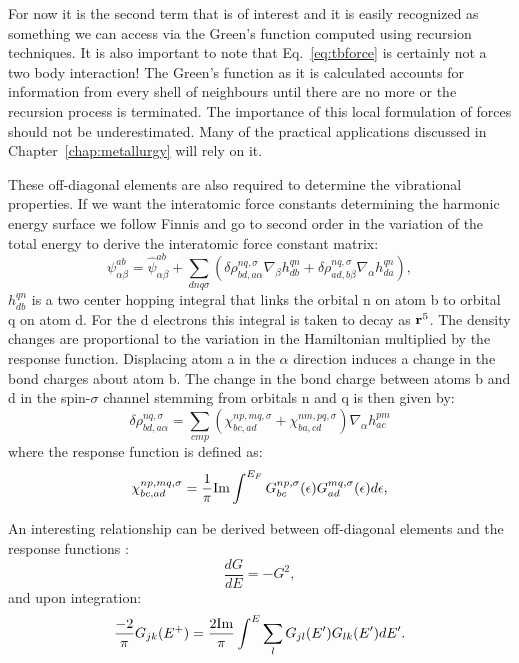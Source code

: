 For now it is the second term that is of interest and
it is easily recognized as something we can access via the Green's function 
computed using recursion techniques. It is also important to note that 
Eq.~\ref{eq:tbforce} is certainly not a two body interaction! The Green's function 
as it is calculated accounts for information from every shell of neighbours 
until there are no more or the recursion process is terminated. 
The importance of this local formulation of forces should not be underestimated.
Many of the practical applications discussed in Chapter~\ref{chap:metallurgy} 
will rely on it.

%
These off-diagonal elements are also required to determine the vibrational properties. 
If we want the interatomic force constants determining the harmonic energy surface 
we follow Finnis\cite{finnis84} and go to second order in the variation of the 
total energy to derive the interatomic force constant matrix:
%
\begin{equation}
\label{eq:tbdynmat}
\psi_{\alpha\beta}^{ab} = \hat{\psi}_{\alpha\beta}^{ab} +  \sum_{dnq\sigma}(\delta 
\rho_{bd,a\alpha}^{nq,\sigma}\nabla_{\beta}h_{db}^{qn} + \delta\rho_{ad,b\beta}^{nq,\sigma}\nabla_{\alpha}h_{da}^{qn}),
\end{equation}
%
$h^{qn}_{db}$ is a two center hopping integral that links the orbital n on atom b to orbital 
q on atom d. For the d electrons this integral is taken to decay as
${\bf r}^{5}$. The density changes are proportional to the variation in the Hamiltonian 
multiplied by the response function. Displacing atom a in the $\alpha$ direction induces a change in the
bond charges about atom b. The change in the bond charge between atoms b and d 
in the spin-$\sigma$ channel stemming from orbitals n and q is then given by:
%
\begin{equation}
\label{eq:tbdeltarho}
\delta \rho_{bd,a\alpha}^{nq,\sigma} = \sum_{cmp}(\chi_{bc,ad}^{np,mq,\sigma}+\chi_{ba,cd}^{nm,pq,\sigma})\nabla_{\alpha}h_{ac}^{pm}
\end{equation}
%
where the response function is defined as:
%
\begin{equation}
\label{eq:tbresponse}
\chi_{bc,ad}^{np,mq,\sigma} = \frac{1}{\pi}{\rm Im}\int^{E_{F}}G_{bc}^{np,\sigma}(\epsilon)G_{ad}^{mq,\sigma}(\epsilon)d\epsilon,
\end{equation}
%

An interesting relationship can be derived between off-diagonal elements
and the response functions \cite{terakura82, sutton88}:
%
\begin{equation}
\frac{dG}{dE}=-G^{2},
\end{equation}
%
and upon integration:
%
\begin{equation}
\frac{-2}{\pi}G_{jk}(E^{+}) = \frac{2{\rm Im}}{\pi}\int^{E}\sum_{l}G_{jl}(E')G_{lk}(E')dE'.
\end{equation}
%

